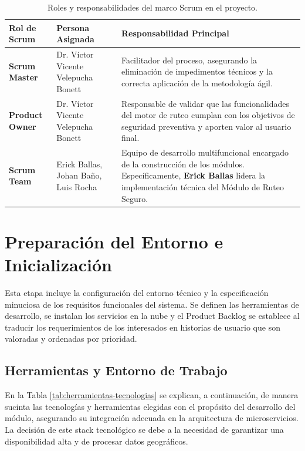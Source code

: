 \begin{table}[H]
\caption{Roles y responsabilidades del marco Scrum en el proyecto.}
\label{tab:roles-scrum}
\centering
\begin{tabular}{|p{3cm}|p{4cm}|p{7cm}|}
\hline
\textbf{Rol de Scrum} & \textbf{Persona Asignada} & \textbf{Responsabilidad Principal} \\ \hline

\textbf{Scrum Master} 
& Dr. Víctor Vicente Velepucha Bonett 
& Facilitador del proceso, asegurando la eliminación de impedimentos técnicos y la correcta aplicación de la metodología ágil. \\ \hline

\textbf{Product Owner} 
& Dr. Víctor Vicente Velepucha Bonett 
& Responsable de validar que las funcionalidades del motor de ruteo cumplan con los objetivos de seguridad preventiva y aporten valor al usuario final. \\ \hline

\textbf{Scrum Team} 
& Erick Ballas, Johan Baño, Luis Rocha 
& Equipo de desarrollo multifuncional encargado de la construcción de los módulos. Específicamente, \textbf{Erick Ballas} lidera la implementación técnica del Módulo de Ruteo Seguro. \\ \hline

\end{tabular}
\end{table}

\section{Preparación del Entorno e Inicialización}

Esta etapa incluye la configuración del entorno técnico y la especificación minuciosa de los requisitos funcionales del sistema. Se definen las herramientas de desarrollo, se instalan los servicios en la nube y el Product Backlog se establece al traducir los requerimientos de los interesados en historias de usuario que son valoradas y ordenadas por prioridad.

\subsection{Herramientas y Entorno de Trabajo}
En la Tabla \ref{tab:herramientas-tecnologias} se explican, a continuación, de manera sucinta las tecnologías y herramientas elegidas con el propósito del desarrollo del módulo, asegurando su integración adecuada en la arquitectura de microservicios. La decisión de este stack tecnológico se debe a la necesidad de garantizar una disponibilidad alta y de procesar datos geográficos. 

